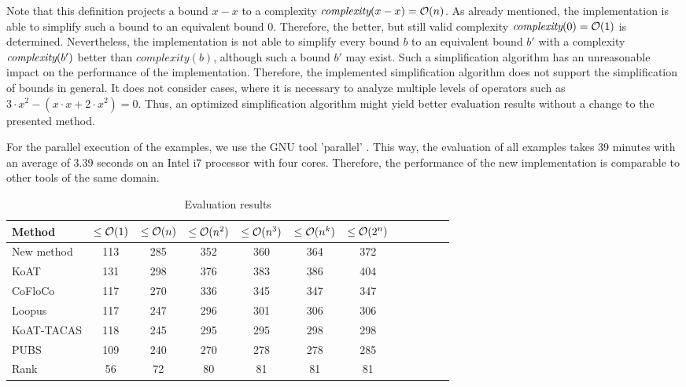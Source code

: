 

Note that this definition projects a bound $x-x$ to a complexity $\emph{complexity}(x-x) = \mathcal{O}(n)$.
As already mentioned, the implementation is able to simplify such a bound to an equivalent bound $0$.
Therefore, the better, but still valid complexity $\emph{complexity}(0) = \mathcal{O}(1)$ is determined.
Nevertheless, the implementation is not able to simplify every bound $b$ to an equivalent bound $b'$ with a complexity $\emph{complexity}(b')$ better than $complexity(b)$, although such a bound $b'$ may exist.
Such a simplification algorithm has an unreasonable impact on the performance of the implementation.
Therefore, the implemented simplification algorithm does not support the simplification of bounds in general.
It does not consider cases, where it is necessary to analyze multiple levels of operators such as $3 \cdot x^2-(x \cdot x+2 \cdot x^2) = 0$.
Thus, an optimized simplification algorithm might yield better evaluation results without a change to the presented method.

For the parallel execution of the examples, we use the GNU tool 'parallel' \cite{gnuparallel}.
This way, the evaluation of all examples takes 39 minutes with an average of 3.39 seconds on an Intel i7 processor with four cores.
Therefore, the performance of the new implementation is comparable to other tools of the same domain.

\begin{table}
  \begin{center}
    \label{tab:evaluation}
    \begin{tabular}{l|c|c|c|c|c|c|c|c|c|c|c}
      Method & $\leq\mathcal{O}(1)$ & $\leq\mathcal{O}(n)$ & $\leq\mathcal{O}(n^2)$ & $\leq\mathcal{O}(n^3)$ & $\leq\mathcal{O}(n^k)$ & $\leq\mathcal{O}(2^n)$\\
      \hline
      New method & 113 & 285 & 352 & 360 & 364 & 372 \\
      KoAT       & 131 & 298 & 376 & 383 & 386 & 404 \\
      CoFloCo    & 117 & 270 & 336 & 345 & 347 & 347 \\
      Loopus     & 117 & 247 & 296 & 301 & 306 & 306 \\
      KoAT-TACAS & 118 & 245 & 295 & 295 & 298 & 298 \\
      PUBS       & 109 & 240 & 270 & 278 & 278 & 285 \\
      Rank       & 56  &  72 &  80 &  81 &  81 &  81 \\
    \end{tabular}
  \end{center}
  \caption{Evaluation results}
\end{table}

